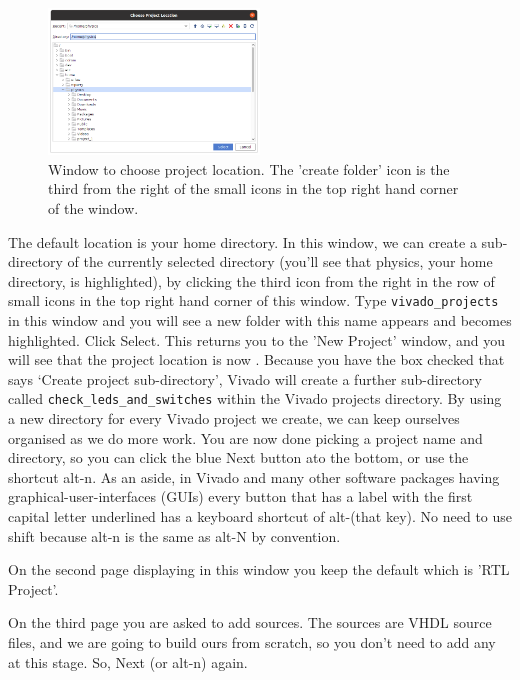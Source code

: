 \documentclass[../physical_computing.tex]{subfiles}
\begin{document}
\begin{figure}[htbp]
    \centering
    \includegraphics[width=0.5\textwidth]{figures/choose_project_location.png}
    \caption{Window to choose project location. The 'create folder' icon is the third from the right of the small icons in the top right hand corner of the window.}
    \label{fig:choose_project_location}
\end{figure}

The default location is your home directory. In this window, we can create a sub-directory of the currently selected directory (you'll see that physics, your home directory, is highlighted), by clicking the third icon from the right in the row of small icons in the top right hand corner of this window. Type \texttt{vivado\_projects} in this window and you will see a new folder with this name appears and becomes highlighted. Click Select. This returns you to the 'New Project' window, and you will see that the project location is now . Because you have the box checked that says `Create project sub-directory', Vivado will create a further sub-directory called \texttt{check\_leds\_and\_switches} within the Vivado projects directory. By using a new directory for every Vivado project we create, we can keep ourselves organised as we do more work. You are now done picking a project name and directory, so you can click the blue Next button ato the bottom, or use the shortcut alt-n. As an aside, in Vivado and many other software packages having graphical-user-interfaces (GUIs) every button that has a label with the first capital letter underlined has a keyboard shortcut of alt-(that key). No need to use shift because alt-n is the same as alt-N by convention. 

On the second page displaying in this window you keep the default which is 'RTL Project'.

On the third page you are asked to add sources. The sources are VHDL source files, and we are going to build ours from scratch, so you don't need to add any at this stage. So, Next (or alt-n) again. 
\end{document}
